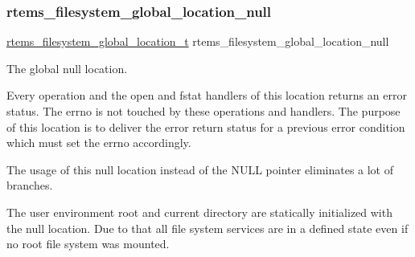 \subsubsection{\texorpdfstring{rtems\_filesystem\_global\_location\_null}{rtems\_filesystem\_global\_location\_null}}
{\footnotesize\ttfamily \mbox{\hyperlink{structrtems__filesystem__global__location__t}{rtems\+\_\+filesystem\+\_\+global\+\_\+location\+\_\+t}} rtems\+\_\+filesystem\+\_\+global\+\_\+location\+\_\+null}



The global null location. 

Every operation and the open and fstat handlers of this location returns an error status. The errno is not touched by these operations and handlers. The purpose of this location is to deliver the error return status for a previous error condition which must set the errno accordingly.

The usage of this null location instead of the N\+U\+LL pointer eliminates a lot of branches.

The user environment root and current directory are statically initialized with the null location. Due to that all file system services are in a defined state even if no root file system was mounted. 